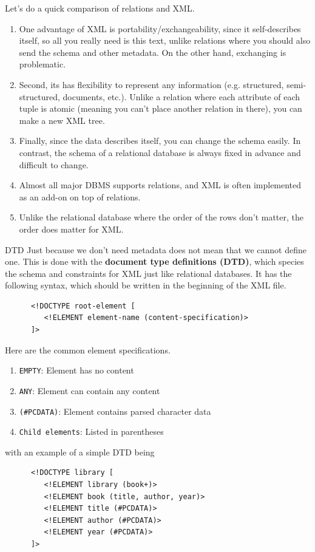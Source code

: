 \documentclass{article}
\begin{document}
  Let's do a quick comparison of relations and XML. 
  \begin{enumerate}
    \item One advantage of XML is portability/exchangeability, since it self-describes itself, so all you really need is this text, unlike relations where you should also send the schema and other metadata. On the other hand, exchanging is problematic. 
    \item Second, its has flexibility to represent any information (e.g. structured, semi-structured, documents, etc.). Unlike a relation where each attribute of each tuple is atomic (meaning you can't place another relation in there), you can make a new XML tree. 
    \item Finally, since the data describes itself, you can change the schema easily. In contrast, the schema of a relational database is always fixed in advance and difficult to change. 
    \item Almost all major DBMS supports relations, and XML is often implemented as an add-on on top of relations. 
    \item Unlike the relational database where the order of the rows don't matter, the order does matter for XML. 
  \end{enumerate}
  
  \begin{definition}{DTD}
    Just because we don't need metadata does not mean that we cannot define one. This is done with the \textbf{document type definitions (DTD)}, which species the schema and constraints for XML just like relational databases. It has the following syntax, which should be written in the beginning of the XML file. 
    \begin{lstlisting}
      <!DOCTYPE root-element [
         <!ELEMENT element-name (content-specification)>
      ]> 
    \end{lstlisting} 
    Here are the common element specifications. 
    \begin{enumerate}
      \item \texttt{EMPTY}: Element has no content
      \item \texttt{ANY}: Element can contain any content
      \item \texttt{(\#PCDATA)}: Element contains parsed character data
      \item \texttt{Child elements}: Listed in parentheses
    \end{enumerate}
    with an example of a simple DTD being 
    \begin{lstlisting}
      <!DOCTYPE library [
         <!ELEMENT library (book+)>
         <!ELEMENT book (title, author, year)>
         <!ELEMENT title (#PCDATA)>
         <!ELEMENT author (#PCDATA)>
         <!ELEMENT year (#PCDATA)>
      ]> 
    \end{lstlisting}
  \end{definition}
\end{document}
